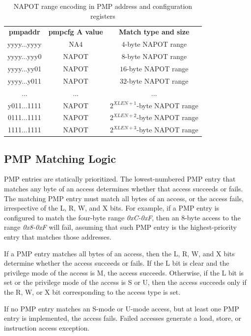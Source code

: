 \begin{table}
  \centering
  \begin{tabular}{|c|c|c|}
    \hline
    \textbf{pmpaddr}          & \textbf{pmpcfg A value} & \textbf{Match type and size}  \\
    \hhline {===} yyyy...yyyy & NA4                     & $4$-byte NAPOT range          \\
    \hline
    yyyy...yyy0               & NAPOT                   & $8$-byte NAPOT range          \\
    \hline
    yyyy...yy01               & NAPOT                   & $16$-byte NAPOT range         \\
    \hline
    yyyy...y011               & NAPOT                   & $32$-byte NAPOT range         \\
    \hline
    ...                       & ...                     & ...                           \\
    \hline
    y011...1111               & NAPOT                   & $2^{XLEN+1}$-byte NAPOT range \\
    \hline
    0111...1111               & NAPOT                   & $2^{XLEN+2}$-byte NAPOT range \\
    \hline
    1111...1111               & NAPOT                   & $2^{XLEN+3}$-byte NAPOT range \\
    \hline
  \end{tabular}
  \caption{NAPOT range encoding in PMP address and configuration registers}
  \label{tab:napotencodings}
\end{table}

\subsection{PMP Matching Logic}
\label{subsec:matchinglogic}

PMP entries are statically prioritized. The lowest-numbered PMP entry that matches
any byte of an access determines whether that access succeeds or fails. The
matching PMP entry must match all bytes of an access, or the access fails,
irrespective of the L, R, W, and X bits. For example, if a PMP entry is configured
to match the four-byte range \textit{0xC-0xF}, then an $8$-byte access to the range
\textit{0x8-0xF} will fail, assuming that such PMP entry is the highest-priority
entry that matches those addresses.

If a PMP entry matches all bytes of an access, then the L, R, W, and X bits determine
whether the access succeeds or fails. If the L bit is clear and the privilege
mode of the access is M, the access succeeds. Otherwise, if the L bit is set or the
privilege mode of the access is S or U, then the access succeeds only if the R, W,
or X bit corresponding to the access type is set.

If no PMP entry matches an S-mode or U-mode access, but at least one PMP entry is
implemented, the access fails. Failed accesses generate a load, store, or instruction
access exception.
